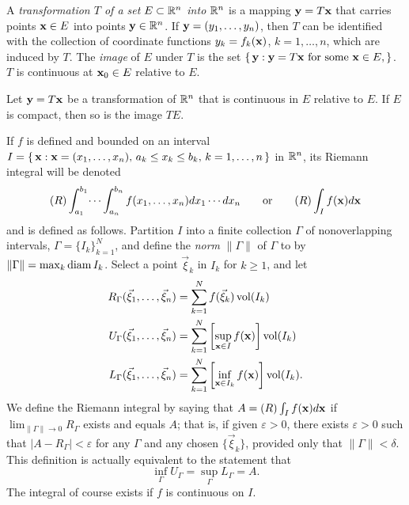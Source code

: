 A \emph{transformation $T$ of a set $E\subset\mathbb{R}^n$ into $\mathbb{R}^n$} is a
mapping $\mathbf{y}=T\mathbf{x}$ that carries points $\mathbf{x}\in E$ into points
$\mathbf{y}\in\mathbb{R}^n$. If $\mathbf{y}=(y_1,\dotsc,y_n)$, then $T$ can be identified
with the collection of coordinate functions $y_k=f_k(\mathbf{x})$,
$k=1,\dotsc,n$, which are induced by $T$. The \emph{image} of $E$ under $T$
is the set $\left\{\,\mathbf{y}:\text{$\mathbf{y}=T\mathbf{x}$ for some $\mathbf{x}\in
    E$},\right\}$. $T$ is continuous at $\mathbf{x}_0\in E$ relative to $E$.

\begin{theorem}[1.17]
Let $\mathbf{y}=T\mathbf{x}$ be a transformation of $\mathbb{R}^n$ that is continuous in $E$
relative to $E$. If $E$ is compact, then so is the image $TE$.
\end{theorem}

If $f$ is defined and bounded on an interval
$I=\left\{\,\mathbf{x}:\text{$\mathbf{x}=(x_1,\dotsc,x_n)$, $a_k\leq x_k\leq
    b_k$, $k=1,\dotsc,n$}\,\right\}$ in $\mathbb{R}^n$, its Riemann integral will
be denoted
\begin{equation}
  \label{eq:riemann-integral}
(R)\int_{a_1}^{b_1}\dotsi\int_{a_n}^{b_n}f(x_1,\dotsc,x_n) d
x_1\dotsm d  x_n
\qquad\text{or}\qquad
(R)\int_I f(\mathbf{x}) d \mathbf{x}
\end{equation}
and is defined as follows. Partition $I$ into a finite collection $\Gamma$
of nonoverlapping intervals, $\Gamma={\{I_k\}}_{k=1}^N$, and define the
\emph{norm} $\|\Gamma\|$ of $\Gamma$ to by $\|\Gamma\|=\max_k \operatorname{diam}
I_k$. Select a point $\vec\xi_k$ in $I_k$ for $k\geq 1$, and let
\begin{equation}
\label{eq:riemannian-integral-partitions}
\begin{aligned}
R_\Gamma(\vec\xi_1,\dotsc,\vec\xi_n)&=\sum_{k=1}^N f(\vec\xi_k)\operatorname{vol}(I_k)\\
U_\Gamma(\vec\xi_1,\dotsc,\vec\xi_n)&=\sum_{k=1}^N\left[\sup_{\mathbf{x}\in I}
  f(\mathbf{x})\right]\operatorname{vol}(I_k)\\
L_\Gamma(\vec\xi_1,\dotsc,\vec\xi_n)&=\sum_{k=1}^N\left[\inf_{\mathbf{x}\in
    I_k}f(\mathbf{x})\right]\operatorname{vol}(I_k).
\end{aligned}
\end{equation}
We define the Riemann integral by saying that $A= (R)\int_I
f(\mathbf{x})d\mathbf{x}$ if $\lim_{\|\Gamma\|\to 0}R_\Gamma$ exists and equals
$A$; that is, if given $\varepsilon>0$, there exists $\varepsilon>0$ such
that $|A-R_\Gamma|<\varepsilon$ for any $\Gamma$ and any chosen
$\{\vec\xi_k\}$, provided only that $\|\Gamma\|<\delta$. This definition is
actually equivalent to the statement that
\begin{equation}
  \label{eq:upper-lower-rieemann-sums}
\inf_\Gamma U_\Gamma=\sup_\Gamma L_\Gamma=A.
\end{equation}
The integral of course exists if $f$ is continuous on $I$.


